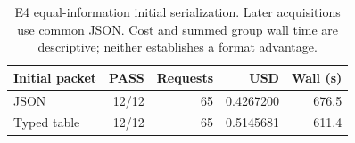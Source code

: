 \begin{table}[htbp]
\centering\small
\caption{E4 equal-information initial serialization. Later acquisitions use common JSON. Cost and summed group wall time are descriptive; neither establishes a format advantage.}
\label{tab:format}
\begin{tabular}{@{}lrrrr@{}}\toprule
Initial packet & PASS & Requests & USD & Wall (s) \\\midrule
JSON & 12/12 & 65 & 0.4267200 & 676.5 \\
Typed table & 12/12 & 65 & 0.5145681 & 611.4 \\
\bottomrule\end{tabular}
\end{table}
